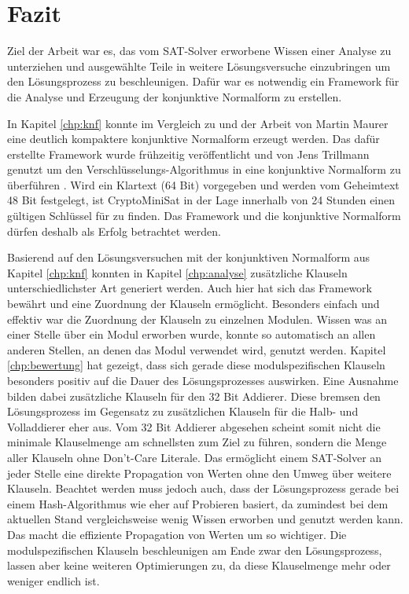 \chapter{Fazit}
\label{chp:fazit}

Ziel der Arbeit war es, das vom SAT-Solver erworbene Wissen einer Analyse zu unterziehen und ausgewählte Teile in weitere Lösungsversuche
einzubringen um den Lösungsprozess zu beschleunigen. Dafür war es notwendig ein Framework für die Analyse und Erzeugung der konjunktive Normalform zu erstellen.

In Kapitel \ref{chp:knf} konnte im Vergleich zu  und der Arbeit von Martin Maurer eine deutlich kompaktere konjunktive Normalform erzeugt werden.
Das dafür erstellte Framework wurde frühzeitig veröffentlicht und von Jens Trillmann genutzt um den Verschlüsselungs-Algorithmus  in eine
konjunktive Normalform zu überführen \cite{trillmann}. Wird ein Klartext (64 Bit) vorgegeben und werden vom Geheimtext 48 Bit festgelegt, ist CryptoMiniSat
in der Lage innerhalb von 24 Stunden einen gültigen Schlüssel für  zu finden. Das Framework und die konjunktive Normalform dürfen deshalb als
Erfolg betrachtet werden.

Basierend auf den Lösungsversuchen mit der konjunktiven Normalform aus Kapitel \ref{chp:knf} konnten in Kapitel \ref{chp:analyse} zusätzliche Klauseln
unterschiedlichster Art generiert werden. Auch hier hat sich das Framework bewährt und eine Zuordnung der Klauseln ermöglicht. Besonders einfach und
effektiv war die Zuordnung der Klauseln zu einzelnen Modulen. Wissen was an einer Stelle über ein Modul erworben wurde, konnte so automatisch an allen
anderen Stellen, an denen das Modul verwendet wird, genutzt werden. Kapitel \ref{chp:bewertung} hat gezeigt, dass sich gerade diese modulspezifischen
Klauseln besonders positiv auf die Dauer des Lösungsprozesses auswirken. Eine Ausnahme bilden dabei zusätzliche Klauseln für den 32 Bit Addierer. Diese
bremsen den Lösungsprozess im Gegensatz zu zusätzlichen Klauseln für die Halb- und Volladdierer eher aus. Vom 32 Bit Addierer abgesehen scheint somit
nicht die minimale Klauselmenge am schnellsten zum Ziel zu führen, sondern die Menge aller Klauseln ohne Don't-Care Literale. Das ermöglicht einem
SAT-Solver an jeder Stelle eine direkte Propagation von Werten ohne den Umweg über weitere Klauseln. Beachtet werden muss jedoch auch, dass der
Lösungsprozess gerade bei einem Hash-Algorithmus wie  eher auf Probieren basiert, da zumindest bei dem aktuellen Stand vergleichsweise
wenig Wissen erworben und genutzt werden kann. Das macht die effiziente Propagation von Werten um so wichtiger. Die modulspezifischen Klauseln
beschleunigen am Ende zwar den Lösungsprozess, lassen aber keine weiteren Optimierungen zu, da diese Klauselmenge mehr oder weniger endlich ist.


